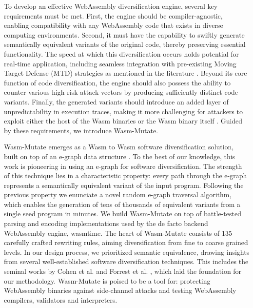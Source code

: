 \documentclass[sigplan,screen]{acmart}
\newcommand*\badge[1]{ \colorbox{red}{\color{white}#1}}
\newcommand{\tool}{{\sc Wasm-Mutate}\xspace}
\newcommand{\wasm}{Wasm\xspace}
\newcommand{\Wasm}{WebAssembly\xspace}
\newcommand{\todo}[1]{%
\refstepcounter{todo}
\noindent\textbf{\badge{TODO}} {\color{red}#1}
\addcontentsline{td}{todo}
{\color{red}\thesection.\thetodo\xspace #1}}
\begin{document}
To develop an effective WebAssembly  diversification engine, several key requirements must be met. 
First, the engine should be compiler-agnostic, enabling compatibility with any \Wasm code that exists in diverse computing environments. 
Second, it must have the capability to swiftly generate semantically equivalent variants of the original code, thereby preserving essential functionality. 
The speed at which this diversification occurs holds potential for real-time application, including seamless integration with pre-existing Moving Target Defense (MTD) strategies as mentioned in the literature \cite{MEWE}. 
Beyond its core function of code diversification, the engine should also possess the ability to counter various high-risk attack vectors by producing sufficiently distinct code variants.
Finally, the generated variants should introduce an added layer of unpredictability in execution traces, making it more challenging for attackers to exploit either the host of the \wasm binaries or the \wasm binary itself \cite{10.1145/3321705.3329819}. 
Guided by these requirements, we introduce \tool.

\tool emerges as a \wasm to \wasm software diversification solution, built on top of an e-graph data structure \cite{10.1145/3434304}.
To the best of our knowledge, this work is pioneering in using an e-graph  for software diversification.
The strength of this technique lies in a characteristic property: every path through the e-graph represents a semantically equivalent variant of the input program. 
Following the previous property we enunciate a novel random e-graph traversal algorithm, which enables the generation of tens of thousands of equivalent variants from a single seed program in minutes.
We build \tool on top of battle-tested parsing and encoding implementations used by the de facto backend \Wasm engine, wasmtime.
The heart of \tool consists of 135 carefully crafted rewriting rules, aiming diversification from fine to coarse grained levels. 
In our design process, we prioritized semantic equivalence, drawing insights from several well-established software diversification techniques. 
This includes the seminal works by Cohen et al. \cite{cohen1993operating} and Forrest et al. \cite{595185}, which laid the foundation for our methodology.
\tool is poised to be a tool for: protecting \Wasm binaries against side-channel attacks and testing \Wasm compilers, validators and interpreters. 
\end{document}
